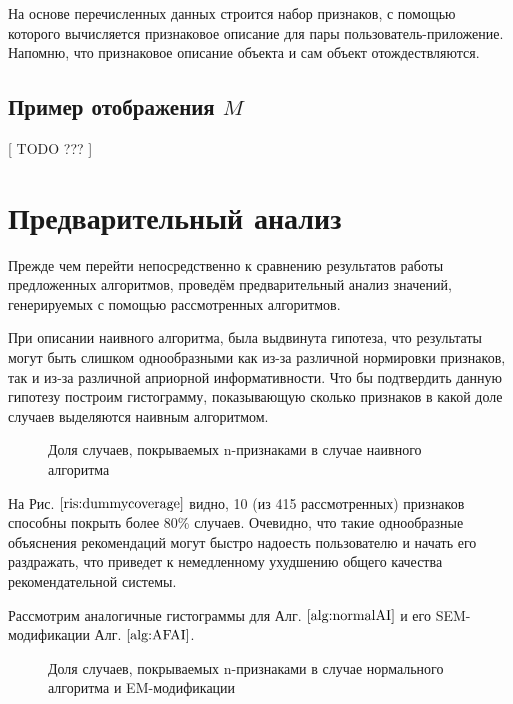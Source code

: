 \documentclass[12pt,a4paper]{report}
\begin{document}
На основе перечисленных данных строится набор признаков, с помощью которого вычисляется признаковое описание для пары пользователь-приложение. Напомню, что признаковое описание объекта и сам объект отождествляются.

\subsection{Пример отображения $M$}
[ TODO ??? ]

\section{Предварительный анализ}
Прежде чем перейти непосредственно к сравнению результатов работы предложенных алгоритмов, проведём предварительный анализ значений, генерируемых с помощью рассмотренных алгоритмов.

При описании наивного алгоритма, была выдвинута гипотеза, что результаты могут быть слишком однообразными как из-за различной нормировки признаков, так и из-за различной априорной информативности. Что бы подтвердить данную гипотезу построим гистограмму, показывающую сколько признаков в какой доле случаев выделяются наивным алгоритмом.

\begin{figure}[H]
\caption{Доля случаев, покрываемых n-признаками в случае наивного алгоритма}
\label{ris:dummycoverage}
\end{figure}

На Рис. $\ref{ris:dummycoverage}$ видно, 10 (из 415 рассмотренных) признаков способны покрыть более 80\% случаев.
Очевидно, что такие однообразные объяснения рекомендаций могут быстро надоесть пользователю и начать его раздражать, что приведет к немедленному ухудшению общего качества рекомендательной системы.

Рассмотрим аналогичные гистограммы для Алг. $\ref{alg:normalAI}$ и его SEM-модификации Алг. 
$\ref{alg:AFAI}$.

\begin{figure}[H]
\caption{Доля случаев, покрываемых n-признаками в случае нормального алгоритма и EM-модификации}
\label{ris:normalcoverage}
\end{figure}
\end{document}

